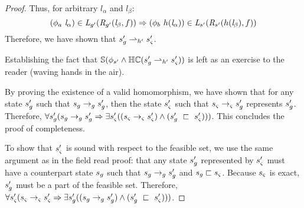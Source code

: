 \begin{proof}
Thus, for arbitrary $l_\alpha$ and $l_\beta$:
$$(\phi_a\ \emph{l}_\alpha) \in \emph{L}_{g^\prime}(\emph{R}_{g^\prime}(\emph{l}_\beta,f )) \Rightarrow (\phi_b\ h(\emph{l}_\alpha))\in \emph{L}_{s^\prime}(\emph{R}_{s^\prime} (h(\emph{l}_\beta),f ))$$
Therefore, we have shown that $s_{g}^\prime \rightharpoonup_{h^\prime} s_{\varsigma}^\prime$.

Establishing the fact that $\mathbb{S}(\phi_{s^\prime} \wedge \mathbb{HC}(s_{g}^\prime \rightharpoonup_{h^\prime} s_{\varsigma}^\prime) )$ is left as an exercise to the reader (waving hands in the air).

By proving the existence of a valid homomorphism, we have shown that for any state $s_{g}^\prime$ such that $s_{g} \rightarrow_{g} s_{g}^\prime$, then the state $s_{\varsigma}^\prime$ such that $s_{\varsigma} \rightarrow_{\varsigma} s_{g}^\prime$ represents $s_{g}^\prime$. Therefore, $\forall s_{g}^\prime ( s_{g} \rightarrow_{g} s_{g}^\prime \Rightarrow \exists s_{\varsigma}^\prime( (s_{\varsigma} \rightarrow_{\varsigma} s_{\varsigma}^\prime )\wedge (s_{g}^\prime\ \sqsubset\ s_{\varsigma}^\prime ))  )$. This concludes the proof of completeness.

To show that $s_{\varsigma}^\prime$ is sound with respect to the feasible set, we use the same argument as in the field read proof: that any state $s_{g}^\prime$ represented by $s_{\varsigma}^\prime$ must have a counterpart state $s_{g}$ such that $s_{g} \rightarrow_{g} s_{g}^\prime$ and $s_{g} \sqsubset s_{\varsigma}$. Because $s_{\varsigma}$ is exact, $s_{g}^\prime$ must be a part of the feasible set. Therefore, $\forall s_\sym^\prime ( s_\sym \rsym s_\sym^\prime\Rightarrow \exists s_\gse^\prime( (s_\gse \rgse s_\gse^\prime )\wedge (s_\gse^\prime\ \sqsubset\ s_\sym^\prime ))  )$.

\end{proof}


